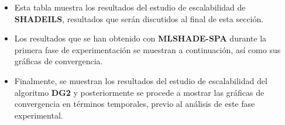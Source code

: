 \begin{itemize}
\item Esta tabla muestra los resultados del estudio de escalabilidad de \textbf{SHADEILS}, resultados que serán discutidos al final de esta sección.

\begin{table}[H]
	\centering
		\caption{\textbf{SHADEILS} - Escalabilidad: \textbf{100K Evals} }
		\label{tabla:ResSHADEILS-Exp1}
\end{table}


\item Los resultados que se han obtenido con \textbf{MLSHADE-SPA} durante la primera fase de experimentación se muestran a continuación, así como sus gráficas de convergencia.

\begin{table}[H]
	\centering
		\caption{\textbf{MLSHADE-SPA} - Escalabilidad: \textbf{100K Evals} }
		\label{tabla:ResMLSHADESPA-Exp1}
\end{table}


\item Finalmente, se muestran los resultados del estudio de escalabilidad del algoritmo \textbf{DG2} y posteriormente se procede a mostrar las gráficas de convergencia en términos temporales, previo al análisis de este fase experimental.


\end{itemize}

